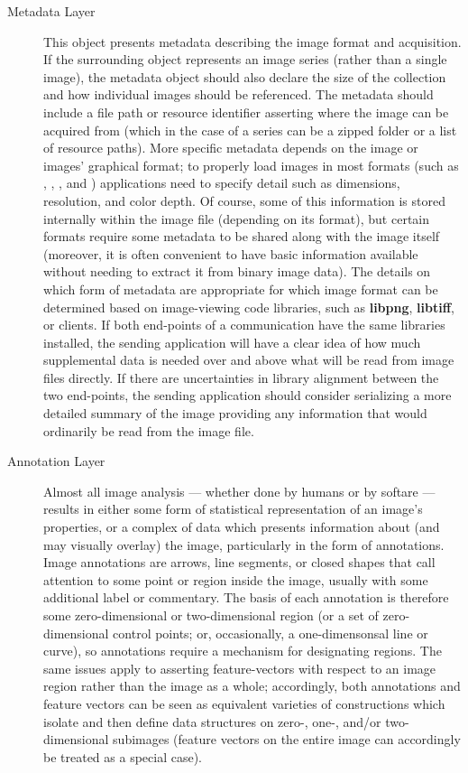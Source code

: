 \documentclass[11pt,letterpaper]{article}
\newcommand{\DICOM}{\resizebox{!}{7pt}{\AcronymText{DICOM}}}
\newcommand{\ATextCClr}[1]{\textcolor{atcColor}{\textbf{#1}}}
\newcommand{\DSPIN}{{\resizebox{!}{7.5pt}{\ATextCClr{D-SPIN}}}}
\newcommand{\TwoD}{\resizebox{!}{7pt}{\AcronymText{2D}}}
\newcommand{\textscc}[1]{{\color{orr!35!black}{{%
						\fontfamily{Cabin-TLF}\fontseries{b}\selectfont{\textsc{\scriptsize{#1}}}}}}}
\newcommand{\AcronymText}[1]{{\textscc{#1}}}
\begin{document}
{{\begin{description}
\item[Metadata Layer]  This object presents 
metadata describing the image format and acquisition.  
If the surrounding \DSPIN{} object represents an 
image series (rather than a single image), the 
metadata object should also declare the 
size of the collection and how individual 
images should be referenced.  The metadata 
should include a file path or resource identifier 
asserting where the image can be acquired from 
(which in the case of a series can be a zipped 
folder or a list of resource paths).  More 
specific metadata depends on the image or images' 
graphical format; to properly load images in 
most formats (such as \PNG{}, \JPEG{}, \TIFF{}, 
and \DICOM{}) applications need to specify 
detail such as dimensions, resolution, and 
color depth.  Of course, some of this information 
is stored internally within the image file 
(depending on its format), but certain formats 
require some metadata to be shared along with 
the image itself (moreover, it is often convenient 
to have basic information available without needing 
to extract it from binary image data).  The details 
on which form of metadata are appropriate for 
which image format can be determined based 
on image-viewing code libraries, such as 
\textbf{libpng}, \textbf{libtiff}, or 
\DICOM{} clients.  If both end-points of a 
\DSPIN{} communication have the same 
libraries installed, the sending application 
will have a clear idea of how much supplemental 
data is needed over and above what will be 
read from image files directly.  If there 
are uncertainties in library alignment between 
the two end-points, the sending application should 
consider serializing a more detailed summary of 
the image providing any information that would 
ordinarily be read from the image file. 
  
\item[Annotation Layer]
Almost all image analysis --- whether done by 
humans or by softare --- results in either 
some form of statistical representation of 
an image's properties, or a complex of 
data which presents information about 
(and may visually overlay) the image, 
particularly in the form of annotations.  
Image annotations are arrows, line segments, 
or \TwoD{} closed shapes that call attention 
to some point or region inside the image, 
usually with some additional label or commentary.  
The basis of each annotation is therefore 
some zero-dimensional or two-dimensional 
region (or a set of zero-dimensional 
control points; or, occasionally, a one-dimensonsal  
line or curve), so annotations require a mechanism 
for designating regions.  The same 
issues apply to asserting feature-vectors 
with respect to an image region rather than 
the image as a whole; accordingly, 
both annotations and feature vectors 
can be seen as equivalent varieties of 
constructions which isolate and then 
define data structures on zero-, one-, 
and/or two-dimensional subimages 
(feature vectors on the entire image 
can accordingly be treated as a special 
case).    


\end{description}}}
\end{document}

